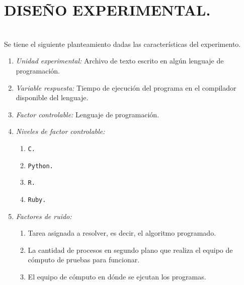 \documentclass[11pt,a4paper]{article}
\begin{document}
\section{DISEÑO EXPERIMENTAL.} %
\label{sec:adaptacion_exp}
\noindent{}\\[3mm]
Se tiene el siguiente planteamiento dadas las características del experimento.
\begin{enumerate}
	\item \textit{Unidad experimental:} Archivo de texto escrito en algún lenguaje de programación.
	\item \textit{Variable respuesta:} Tiempo de ejecución del programa en el compilador disponible del lenguaje.
	\item \textit{Factor controlable:} Lenguaje de programación.
	\item \textit{Niveles de factor controlable:} \vspace{-3mm}
		\begin{multicols}{4}
			\begin{enumerate}
			\item \texttt{C.}
			\item \texttt{Python.}
			\item \texttt{R.}
			\item \texttt{Ruby.}
		\end{enumerate}
		\end{multicols} \vspace{-6mm}
	\item \textit{Factores de ruido:} \vspace{-2mm}
		\begin{enumerate}
			\item Tarea asignada a resolver, es decir, el algoritmo programado.
			\item La cantidad de procesos en segundo plano que realiza el equipo de cómputo de pruebas para funcionar.
			\item El equipo de cómputo en dónde se ejcutan los programas. \vspace{-3mm}
				\begin{multicols}{3}

\end{multicols}
\end{enumerate}
\end{enumerate}
\end{document}
